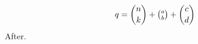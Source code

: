\documentclass{article}
\begin{document}
\begin{equation}
q=\binom{n}{k}+\tbinom{a}{b}+\dbinom{c}{d}
\end{equation}
After.
\end{document}

